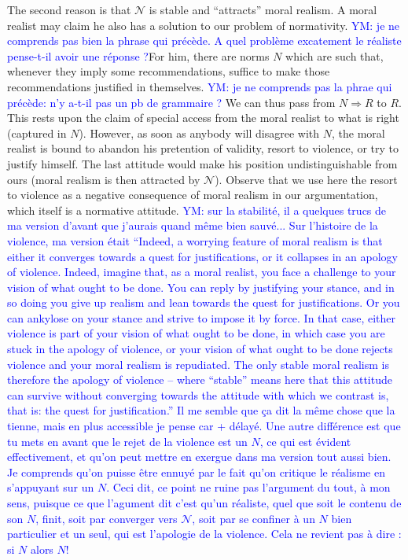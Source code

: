 \documentclass[preprint, french, english, 11pt, authoryear]{elsarticle}%
\newcommand{\commentYM}[1]{\textcolor{blue}{YM: #1}}
\newcommand{\adv}{\mathscr{N}}
\begin{document}
The second reason is that $\adv$ is stable and ``attracts'' moral realism. A moral realist may claim he also has a solution to our problem of normativity. \commentYM{je ne comprends pas bien la phrase qui précède. A quel problème excatement le réaliste pense-t-il avoir une réponse ?}For him, there are norms $N$ which are such that, whenever they imply some recommendations, suffice to make those recommendations justified in themselves. \commentYM{je ne comprends pas la phrae qui précède: n'y a-t-il pas un pb de grammaire ?} We can thus pass from $N ⇒ R$ to $R$. This rests upon the claim of special access from the moral realist to what is right (captured in $N$). However, as soon as anybody will disagree with $N$, the moral realist is bound to abandon his pretention of validity, resort to violence, or try to justify himself. The last attitude would make his position undistinguishable from ours (moral realism is then attracted by $\adv$). Observe that we use here the resort to violence as a negative consequence of moral realism in our argumentation, which itself is a normative attitude. \commentYM{sur la stabilité, il a quelques trucs de ma version d'avant que j'aurais quand même bien sauvé... Sur l'histoire de la violence, ma version était ``Indeed, a worrying feature of moral realism is that either it converges towards a quest for justifications, or it collapses in an apology of violence. Indeed, imagine that, as a moral realist, you face a challenge to your vision of what ought to be done. You can reply by justifying your stance, and in so doing you give up realism and lean towards the quest for justifications. Or you can ankylose on your stance and strive to impose it by force. In that case, either violence is part of your vision of what ought to be done, in which case you are stuck in the apology of violence, or your vision of what ought to be done rejects violence and your moral realism is repudiated. The only stable moral realism is therefore the apology of violence -- where ``stable'' means here that this attitude can survive without converging towards the attitude with which we contrast is, that is: the quest for justification.'' Il me semble que ça dit la même chose que la tienne, mais en plus accessible je pense car + délayé.
Une autre différence est que tu mets en avant que le rejet de la violence est un $N$, ce qui est évident effectivement, et qu'on peut mettre en exergue dans ma version tout aussi bien.
Je comprends qu'on puisse être ennuyé par le fait qu'on critique le réalisme en s'appuyant sur un $N$. Ceci dit, ce point ne ruine pas l'argument du tout, à mon sens, puisque ce que l'agument dit c'est qu'un réaliste, quel que soit le contenu de son $N$, finit, soit par converger vers $\adv$, soit par se confiner à un $N$ bien particulier et un seul, qui est l'apologie de la violence. Cela ne revient pas à dire : si $N$ alors $N$!
}
\end{document}
